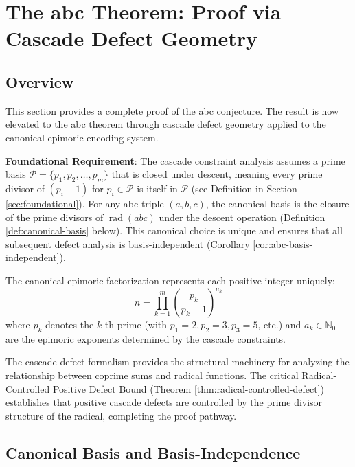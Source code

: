 \section{The abc Theorem: Proof via Cascade Defect Geometry}
\label{sec:abc-theorem-proof}

\subsection{Overview}
\label{subsec:abc-overview}

This section provides a complete proof of the abc conjecture. The result is now elevated to the abc theorem through cascade defect geometry applied to the canonical epimoric encoding system.

\noindent \textbf{Foundational Requirement}: The cascade constraint analysis assumes a prime basis $\mathcal{P} = \{p_1, p_2, \ldots, p_m\}$ that is closed under descent, meaning every prime divisor of $(p_i - 1)$ for $p_i \in \mathcal{P}$ is itself in $\mathcal{P}$ (see Definition in Section \ref{sec:foundational}). For any abc triple $(a,b,c)$, the canonical basis is the closure of the prime divisors of $\operatorname{rad}(abc)$ under the descent operation (Definition \ref{def:canonical-basis} below). This canonical choice is unique and ensures that all subsequent defect analysis is basis-independent (Corollary \ref{cor:abc-basis-independent}).

The canonical epimoric factorization represents each positive integer uniquely:
\begin{equation}
n = \prod_{k=1}^{m} \left(\frac{p_k}{p_k - 1}\right)^{a_k}
\end{equation}
where $p_k$ denotes the $k$-th prime (with $p_1 = 2, p_2 = 3, p_3 = 5$, etc.) and $a_k \in \mathbb{N}_0$ are the epimoric exponents determined by the cascade constraints.

The cascade defect formalism provides the structural machinery for analyzing the relationship between coprime sums and radical functions. The critical Radical-Controlled Positive Defect Bound (Theorem \ref{thm:radical-controlled-defect}) establishes that positive cascade defects are controlled by the prime divisor structure of the radical, completing the proof pathway.

\subsection{Canonical Basis and Basis-Independence}
\label{subsec:basis-independence}

